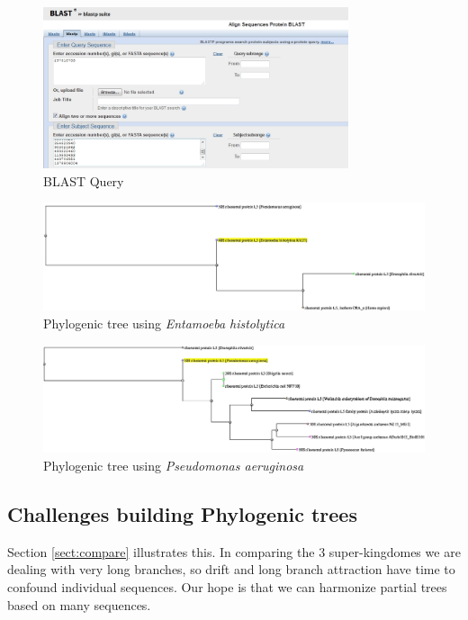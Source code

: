 \documentclass[]{article}
\begin{document}
\begin{figure}[H]
	\caption{BLAST Query}\label{fig:BLAST1}
	\includegraphics[width=0.8\textwidth]{BLAST1}
\end{figure}

\begin{figure}[H]
	\caption{Phylogenic tree using \textit{Entamoeba histolytica}}
	\label{fig:Phylo3}
	\includegraphics[width=\textwidth]{Phylo3}
\end{figure}

\begin{figure}[H]
	\caption{Phylogenic tree using \textit{Pseudomonas aeruginosa}}
	\label{fig:Phylo4}
	\includegraphics[width=\textwidth]{Phylo4}
\end{figure}

\subsection{Challenges building Phylogenic trees}

Section \ref{sect:compare} illustrates this. In comparing the 3 super-kingdomes we are dealing with very long branches, so drift and long branch attraction have time to confound individual sequences. Our hope is that we can harmonize partial trees based on many sequences.


\printglossaries




\end{document}
